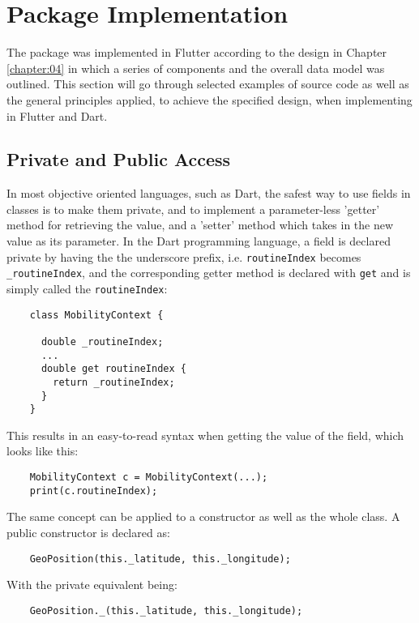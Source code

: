 \section{Package Implementation}
The package was implemented in Flutter according to the design in Chapter \ref{chapter:04} in which a series of components and the overall data model was outlined. This section will go through selected examples of source code as well as the general principles applied, to achieve the specified design, when implementing in Flutter and Dart.

\subsection{Private and Public Access}
In most objective oriented languages, such as Dart, the safest way to use fields in classes is to make them private, and to implement a parameter-less 'getter' method for retrieving the value, and a 'setter' method which takes in the new value as its parameter. In the Dart programming language, a field is declared private by having the the underscore prefix, i.e. \verb|routineIndex| becomes \verb|_routineIndex|, and the corresponding getter method is declared with \verb|get| and is simply called the \verb|routineIndex|:

\begin{verbatim}
    class MobilityContext {
    
      double _routineIndex;
      ...
      double get routineIndex {
        return _routineIndex;
      }
    }
\end{verbatim}

This results in an easy-to-read syntax when getting the value of the field, which looks like this:

\begin{verbatim}
    MobilityContext c = MobilityContext(...);
    print(c.routineIndex);
\end{verbatim}

The same concept can be applied to a constructor as well as the whole class. A public constructor is declared as:
\begin{verbatim}
    GeoPosition(this._latitude, this._longitude);
\end{verbatim}

With the private equivalent being:

\begin{verbatim}
    GeoPosition._(this._latitude, this._longitude);
\end{verbatim}

